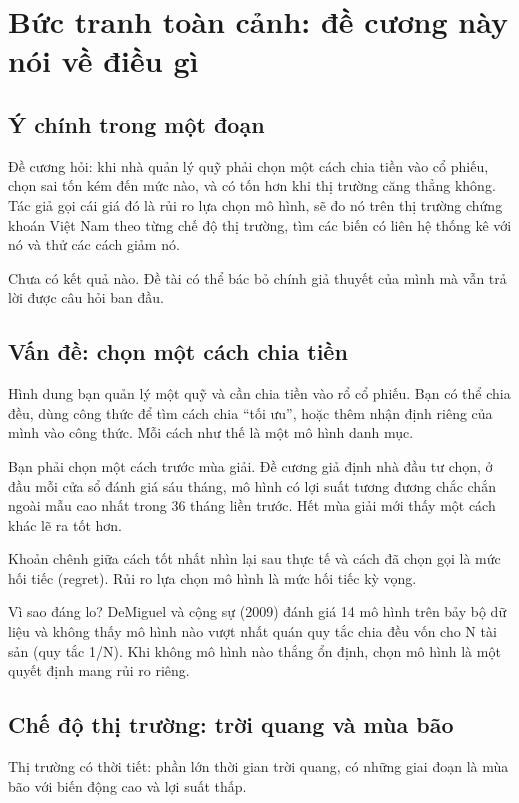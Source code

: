 \chapter{Bức tranh toàn cảnh: đề cương này nói về điều gì}

\section{Ý chính trong một đoạn}

Đề cương hỏi: khi nhà quản lý quỹ phải chọn một cách chia tiền vào cổ phiếu, chọn sai tốn kém đến mức nào, và có tốn hơn khi thị trường căng thẳng không. Tác giả gọi cái giá đó là rủi ro lựa chọn mô hình, sẽ đo nó trên thị trường chứng khoán Việt Nam theo từng chế độ thị trường, tìm các biến có liên hệ thống kê với nó và thử các cách giảm nó.

Chưa có kết quả nào. Đề tài có thể bác bỏ chính giả thuyết của mình mà vẫn trả lời được câu hỏi ban đầu.

\section{Vấn đề: chọn một cách chia tiền}

Hình dung bạn quản lý một quỹ và cần chia tiền vào rổ cổ phiếu. Bạn có thể chia đều, dùng công thức để tìm cách chia “tối ưu”, hoặc thêm nhận định riêng của mình vào công thức. Mỗi cách như thế là một mô hình danh mục.

Bạn phải chọn một cách trước mùa giải. Đề cương giả định nhà đầu tư chọn, ở đầu mỗi cửa sổ đánh giá sáu tháng, mô hình có lợi suất tương đương chắc chắn ngoài mẫu cao nhất trong 36 tháng liền trước. Hết mùa giải mới thấy một cách khác lẽ ra tốt hơn.

Khoản chênh giữa cách tốt nhất nhìn lại sau thực tế và cách đã chọn gọi là mức hối tiếc (regret). Rủi ro lựa chọn mô hình là mức hối tiếc kỳ vọng.

Vì sao đáng lo? DeMiguel và cộng sự (2009) đánh giá 14 mô hình trên bảy bộ dữ liệu và không thấy mô hình nào vượt nhất quán quy tắc chia đều vốn cho N tài sản (quy tắc 1/N). Khi không mô hình nào thắng ổn định, chọn mô hình là một quyết định mang rủi ro riêng.

\section{Chế độ thị trường: trời quang và mùa bão}

Thị trường có thời tiết: phần lớn thời gian trời quang, có những giai đoạn là mùa bão với biến động cao và lợi suất thấp.

